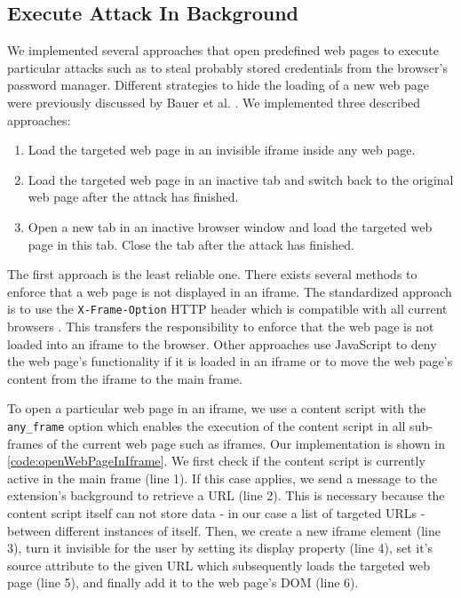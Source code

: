 	
\subsection{Execute Attack In Background}
\label{sec:executeAttackInBackground}

	We implemented several approaches that open predefined web pages to execute particular attacks such as to steal probably stored credentials from the browser's password manager. Different strategies to hide the loading of a new web page were previously discussed by Bauer et al. \cite{extensions:cns14}. We implemented three described approaches:
	
	\begin{enumerate}
		\item Load the targeted web page in an invisible iframe inside any web page.
		\item Load the targeted web page in an inactive tab and switch back to the original web page after the attack has finished.
		\item Open a new tab in an inactive browser window and load the targeted web page in this tab. Close the tab after the attack has finished.
	\end{enumerate} 
	
	The first approach is the least reliable one. There exists several methods to enforce that a web page is not displayed in an iframe. The standardized approach is to use the \texttt{X-Frame-Option} HTTP header which is compatible with all current browsers \cite{xFrameOptionsSpezification, xFrameOptionsCompability}. This transfers the responsibility to enforce that the web page is not loaded into an iframe to the browser. Other approaches use JavaScript to deny the web page's functionality if it is loaded in an iframe or to move the web page's content from the iframe to the main frame.
		
	To open a particular web page in an iframe, we use a content script with the \texttt{any\_frame} option which enables the execution of the content script in all sub-frames of the current web page such as iframes. Our implementation is shown in \autoref{code:openWebPageInIframe}. We first check if the content script is currently active in the main frame (line 1). If this case applies, we send a message to the extension's background to retrieve a URL (line 2). This is necessary because the content script itself can not store data - in our case a list of targeted URLs - between different instances of itself. Then, we create a new iframe element (line 3), turn it invisible for the user by setting its display property (line 4), set it's source attribute to the given URL which subsequently loads the targeted web page (line 5), and finally add it to the web page's DOM (line 6). 
	
